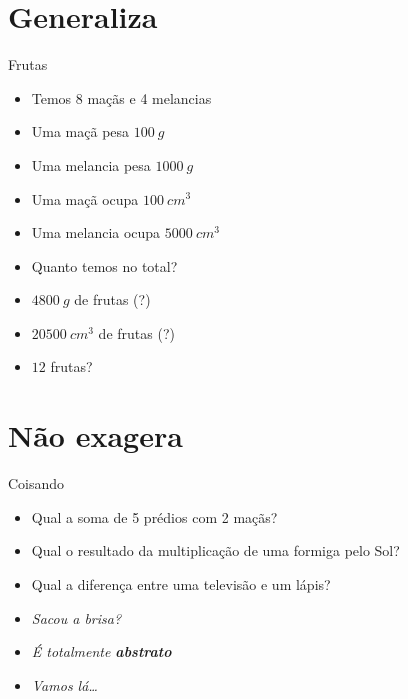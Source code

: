 \documentclass[14pt]{beamer}
\subtitle{Abstraia}
\begin{document}
	
	\begin{frame}
		\titlepage
	\end{frame}

	\begin{frame}
		\tableofcontents
	\end{frame}

	\section{Generaliza}
		\begin{frame}{Frutas}
			\begin{itemize}
				\presentationPause\item Temos 8 maçãs e 4 melancias
				\presentationPause\item Uma maçã pesa $\SI{100}{g}$
				\presentationPause\item Uma melancia pesa $\SI{1000}{g}$
				\presentationPause\item Uma maçã ocupa $\SI{100}{cm^3}$
				\presentationPause\item Uma melancia ocupa $\SI{5000}{cm^3}$
				\presentationPause\item Quanto temos no total?
				\presentationPause\item $\SI{4800}{g}$ de frutas (?)
				\presentationPause\item $\SI{20500}{cm^3}$ de frutas (?)
				\presentationPause\item $12$ frutas?
			\end{itemize}
		\end{frame}

	\section{Não exagera}
		\begin{frame}{Coisando}
			\begin{itemize}
				\presentationPause\item Qual a soma de 5 prédios com 2 maçãs?
				\presentationPause\item Qual o resultado da multiplicação de uma formiga pelo Sol?
				\presentationPause\item Qual a diferença entre uma televisão e um lápis?
				\presentationPause\item \textit{Sacou a brisa?}
				\presentationPause\item \textit{É totalmente \textbf{abstrato}}
				\presentationPause\item \textit{Vamos lá\dots}
			\end{itemize}
		\end{frame}
		
\end{document}

